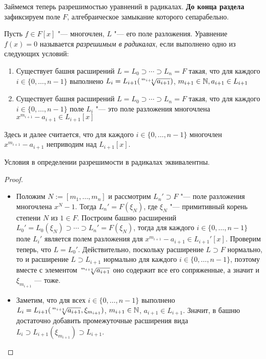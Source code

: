 Займемся теперь разрешимостью уравнений в радикалах. \textbf{До конца раздела} зафиксируем поле $F$, алгебраическое замыкание которого сепарабельно.

\begin{definition}
	Пусть $f \in F[x]$ "--- многочлен, $L$ "--- его поле разложения. Уравнение $f(x) = 0$ называется \textit{разрешимым в радикалах}, если выполнено одно из следующих условий:
	\begin{enumerate}
		\item Существует башня расширений $L = L_0 \supset \dotsb \supset L_n = F$ такая, что для каждого $i \in \{0, \dotsc, n - 1\}$ выполнено $L_{i} = L_{i + 1}(\sqrt[\leftroot{2}\uproot{4}m_{i + 1}]{a_{i + 1}})$, $m_{i + 1} \in \mathbb{N}, a_{i + 1} \in L_{i + 1}$
		\item Существует башня расширений $L = L_0 \supset \dotsb \supset L_n = F$ такая, что для каждого $i \in \{0, \dotsc, n - 1\}$ поле $L_{i}$ "--- это поле разложения многочлена $x^{m_{i + 1}} - a_{i + 1} \in L_{i + 1}[x]$
	\end{enumerate}
	
	Здесь и далее считается, что для каждого $i \in \{0, \dotsc, n - 1\}$ многочлен $x^{m_{i + 1}} - a_{i + 1}$ неприводим над $L_{i+1}[x]$.
\end{definition}

\begin{proposition}
	Условия в определении разрешимости в радикалах эквивалентны.
\end{proposition}

\begin{proof}~
	\begin{itemize}
		\item{}Положим $N := [m_1, \dotsc, m_n]$ и рассмотрим $L_n' \supset F$ "--- поле разложения многочлена $x^N - 1$. Тогда $L_n' = F(\xi_N)$, где $\xi_N$ "--- примитивный корень степени $N$ из $1 \in F$. Построим башню расширений $L_0' = L_0(\xi_N) \supset \dotsb \supset L_n' = F(\xi_N)$, тогда для каждого $i \in \{0, \dotsc, n - 1\}$ поле $L_{i}'$ является полем разложения для $x^{m_{i+1}} - a_{i+1} \in L_{i+1}'[x]$. Проверим теперь, что $L = L_0'$. Действительно, поскольку расширение $L \supset F$ нормально, то и расширение $L \supset L_{i+1}$ нормально для каждого $i \in \{0, \dotsc, n-1\}$, поэтому вместе с элементом $\sqrt[\leftroot{2}\uproot{4}m_{i + 1}]{a_{i + 1}}$ оно содержит все его сопряженные, а значит и $\xi_{m_{i+1}}$ --- тоже.
		
		\item{}Заметим, что для всех $i \in \{0, \dotsc, n - 1\}$ выполнено $L_{i} = L_{i+1}(\sqrt[\leftroot{2}\uproot{4}m_{i+1}]{a_{i+1}}, \xi_{m_{i + 1}})$, $m_{i+1} \in \mathbb{N}$, $a_{i+1} \in L_{i+1}$. Значит, в башню достаточно добавить промежуточные расширения вида $L_{i} \supset L_{i + 1}(\xi_{m_{i + 1}}) \supset L_{i + 1}$.\qedhere
	\end{itemize}
\end{proof}

